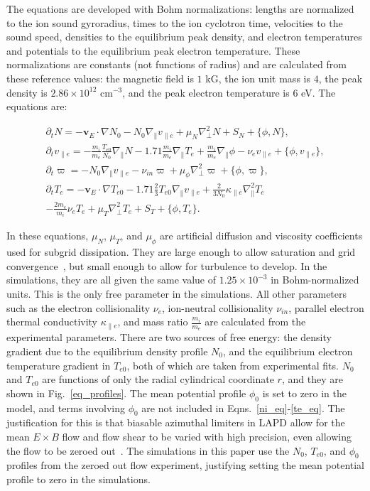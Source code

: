 \documentclass[showpacs,preprintnumbers,amsmath,amssymb,superscriptaddress,aip]{revtex4-1}
\def\beqar{\begin{eqnarray}}
\def\eeqar{\end{eqnarray}}
\newcommand{\pdt}{\partial_t}
\def\grad{\nabla}
\newcommand{\gradpar}{\grad_\parallel}
\newcommand{\gradperp}{\grad_\perp}
\newcommand{\vpe}{v_{\parallel e}}
\newcommand{\nue}{\nu_{e}}
\newcommand{\nuin}{\nu_{in}}
\newcommand{\kpe}{\kappa_{\parallel e}}
\newcommand{\fmie}{\frac{m_i}{m_e}}
\begin{document}
The equations are developed with Bohm normalizations: lengths are
normalized to the ion sound gyroradius, times to the ion
cyclotron time, velocities to the sound speed, densities to the equilibrium peak density, and electron
temperatures and potentials to the equilibrium peak electron temperature. These normalizations are constants (not functions of radius) and are calculated from these reference values:
the magnetic field is $1$ kG, the ion unit mass is $4$, the peak density is $2.86 \times 10^{12}$ cm$^{-3}$, and the peak electron temperature
is $6$ eV. The equations are:

\beqar
\label{ni_eq}
\pdt N = - {\mathbf v_E} \cdot \grad N_0 - N_0 \gradpar \vpe + \mu_N \gradperp^2 N + S_N + \{\phi,N\}, \\
\label{ve_eq}
\pdt \vpe = - \fmie \frac{T_{e0}}{N_0} \gradpar N - 1.71 \fmie \gradpar T_e  + \fmie \gradpar \phi - \nue \vpe + \{\phi,\vpe \}, \\
\label{rho_eq}
\pdt \varpi = - N_0 \gradpar \vpe  - \nuin \varpi + \mu_\phi \gradperp^2 \varpi + \{\phi,\varpi \}, \\
\label{te_eq}
\pdt T_e = - {\mathbf v_E} \cdot \grad T_{e0} - 1.71 \frac{2}{3} T_{e0} \gradpar \vpe + \frac{2}{3 N_0} \kpe \gradpar^2 T_e  \nonumber \\
- \frac{2 m_e}{m_i} \nue T_e  + \mu_T \gradperp^2 T_e +  S_T + \{\phi,T_e\}.
\eeqar

In these equations, $\mu_N$, $\mu_T$, and $\mu_\phi$ are artificial diffusion and viscosity coefficients used for subgrid dissipation. They are large enough to allow saturation
and grid convergence~\cite{friedman2012}, but small enough to allow for turbulence to develop. In the simulations, they are all given the same value of $1.25 \times 10^{-3}$ in Bohm-normalized units. 
This is the only free parameter in the simulations. All other parameters such as the electron collisionality $\nue$, ion-neutral
collisionality $\nuin$, parallel electron thermal conductivity $\kpe$, and mass ratio $\fmie$ are calculated from the experimental parameters.
There are two sources of free energy: the density gradient due to the equilibrium density profile $N_0$, and the equilibrium electron temperature gradient in $T_{e0}$, both of which are
taken from experimental fits. $N_0$ and $T_{e0}$ are functions of only the radial cylindrical coordinate $r$, and they are shown in Fig.~\ref{eq_profiles}. 
The mean potential profile $\phi_0$ is set to zero in the model, and terms involving $\phi_0$ are not included in Eqns.~\ref{ni_eq}-\ref{te_eq}. 
The justification for this is that biasable azimuthal limiters in LAPD allow for the mean $E \times B$ flow and flow shear to be varied with high precision, even allowing the flow to be
zeroed out~\cite{schaffner2012}. 
The simulations in this paper use the $N_0$, $T_{e0}$, and $\phi_0$ profiles from the zeroed out flow experiment, justifying setting the mean potential profile to zero in the simulations.
\end{document}
